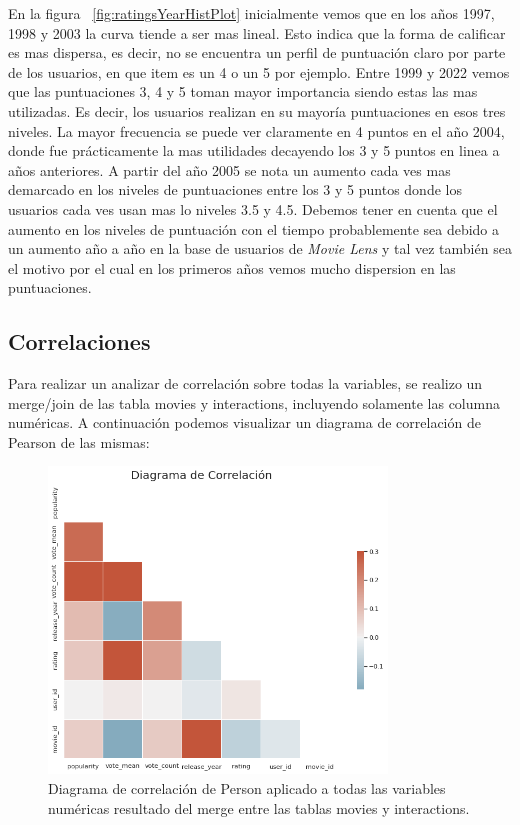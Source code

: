 \documentclass[11pt,a4paper,twoside]{thesis}
\begin{document}
En la figura ~\ref{fig:ratingsYearHistPlot} inicialmente vemos que en los años 1997, 1998 y 2003 la curva tiende a ser mas lineal. Esto indica que la forma de calificar es mas dispersa, es decir, no se encuentra un perfil de puntuación claro por parte de los usuarios, en que item es un 4 o un 5 por ejemplo. Entre 1999 y 2022 vemos que las puntuaciones 3, 4 y 5 toman mayor importancia siendo estas las mas utilizadas. Es decir, los usuarios realizan en su mayoría puntuaciones en esos tres niveles. La mayor frecuencia se puede ver claramente en 4 puntos en el año 2004, donde fue prácticamente la mas utilidades decayendo los 3 y 5 puntos en linea a años anteriores. A partir del año 2005 se nota un aumento cada ves mas demarcado en los niveles de puntuaciones entre los 3 y 5 puntos donde los usuarios cada ves usan mas lo niveles 3.5 y 4.5. Debemos tener en cuenta que el aumento en los niveles de puntuación con el tiempo probablemente sea debido a un aumento año a año en la base de usuarios de \textit{Movie Lens} y tal vez también sea el motivo por el cual en los primeros años vemos mucho dispersion en las puntuaciones.

\clearpage

\subsection{Correlaciones}

Para realizar un analizar de correlación sobre todas la variables, se realizo un merge/join de las tabla movies y interactions, incluyendo solamente las columna numéricas. A continuación podemos visualizar un diagrama de correlación de Pearson de las mismas:

\begin{figure}[h!]
	\centering
	\includegraphics[width=9cm]{./images/Correlations.png}
	\caption{Diagrama de correlación de Person aplicado a todas las variables numéricas resultado del merge entre las tablas movies y interactions.}
	\label{fig:correlationPlot}
\end{figure}	
\end{document}
